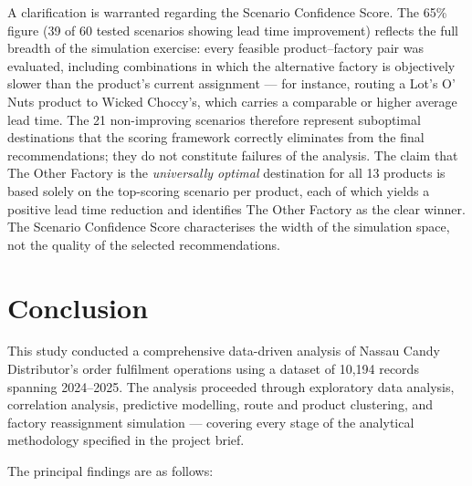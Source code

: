 \documentclass[12pt, a4paper]{article}
\begin{document}
A clarification is warranted regarding the Scenario Confidence
Score. The 65\% figure (39 of 60 tested scenarios showing lead
time improvement) reflects the full breadth of the simulation
exercise: every feasible product--factory pair was evaluated,
including combinations in which the alternative factory is
objectively slower than the product's current assignment ---
for instance, routing a Lot's O' Nuts product to Wicked
Choccy's, which carries a comparable or higher average lead
time. The 21 non-improving scenarios therefore represent
suboptimal destinations that the scoring framework correctly
eliminates from the final recommendations; they do not
constitute failures of the analysis. The claim that The Other
Factory is the \emph{universally optimal} destination for all
13 products is based solely on the top-scoring scenario per
product, each of which yields a positive lead time reduction
and identifies The Other Factory as the clear winner. The
Scenario Confidence Score characterises the width of the
simulation space, not the quality of the selected
recommendations.

\section{Conclusion}
\label{sec:conclusion}

This study conducted a comprehensive data-driven analysis of
Nassau Candy Distributor's order fulfilment operations using
a dataset of 10,194 records spanning 2024--2025. The analysis
proceeded through exploratory data analysis, correlation
analysis, predictive modelling, route and product clustering,
and factory reassignment simulation --- covering every stage of
the analytical methodology specified in the project brief.

The principal findings are as follows:
\end{document}
